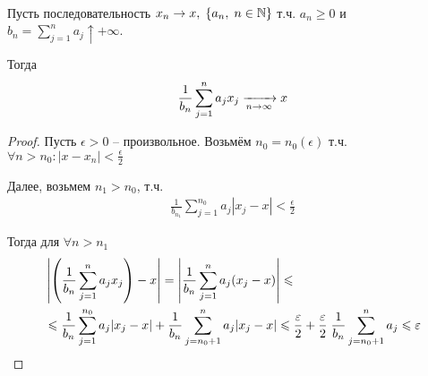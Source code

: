 \begin{lemma}[Тёплиц]~

  Пусть последовательность $x_n \to x,\; \{a_n,\; n \in \mathbb{N}\}$ т.ч. $a_n \geq 0$ и 
  $b_n = \sum\limits_{j = 1}^{n} a_j \uparrow +\infty$.

  Тогда 
  \begin{align*}
    \frac{1}{b_n} \sum\limits_{j = 1}^{n} a_j x_j \xrightarrow[n \to \infty]{} x
  \end{align*}
  
  \begin{proof}
    Пусть $\epsilon > 0$ -- произвольное. Возьмём $n_0 = n_0(\epsilon)$ т.ч. 
    $\forall n > n_0: |x - x_n| < \frac{\epsilon}{2}$

    Далее, возьмем $n_1 > n_0$, т.ч. 
    \begin{align*}
      \frac{1}{b_{n_1}} \sum_{j = 1}^{n_0} a_j |x_j - x| < \frac{\epsilon}{2}
    \end{align*}

    Тогда для $\forall n > n_1$
    \begin{align*}
      &\left | \left( \frac{1}{b_n} \sum_{j = 1}^{n} a_j x_j \right) - x \right | = 
      \left | \frac{1}{b_n} \sum_{j = 1}^{n} a_j (x_j - x) \right | \leqslant \\
      &\leqslant \frac{1}{b_n} \sum_{j = 1}^{n_0} a_j |x_j - x| + 
      \frac{1}{b_n} \sum_{j = n_0 + 1}^{n} a_j |x_j - x| \leqslant 
      \frac{\varepsilon}{2} + \frac{\varepsilon}{2}\; \frac{1}{b_n} \sum_{j = n_0 + 1}^{n} a_j 
      \leqslant \varepsilon
    \end{align*}
  \end{proof}

\end{lemma}

